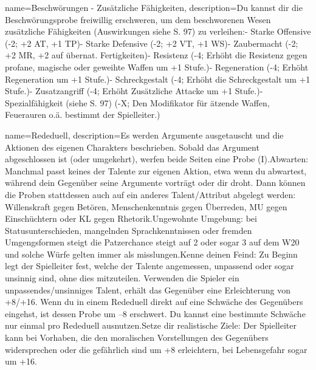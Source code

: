 {
    name={Beschwörungen - Zusätzliche Fähigkeiten},
    description={Du kannst dir die Beschwörungsprobe freiwillig erschweren, um dem beschworenen Wesen zusätzliche Fähigkeiten (Auswirkungen siehe S. 97) zu verleihen:\newline - Starke Offensive (-2; +2 AT, +1 TP)\newline - Starke Defensive (-2; +2 VT, +1 WS)\newline - Zaubermacht (-2; +2 MR, +2 auf übernat. Fertigkeiten)\newline - Resistenz (-4; Erhöht die Resistenz gegen profane, magische oder geweihte Waffen um +1 Stufe.)\newline - Regeneration (-4; Erhöht Regeneration um +1 Stufe.)\newline - Schreckgestalt (-4; Erhöht die Schreckgestalt um +1 Stufe.)\newline - Zusatzangriff (-4; Erhöht Zusätzliche Attacke um +1 Stufe.)\newline - Spezialfähigkeit (siehe S. 97) (-X; Den Modifikator für ätzende Waffen, Feuerauren o.ä. bestimmt der Spielleiter.)}
}


{
    name={Rededuell},
    description={Es werden Argumente ausgetauscht und die Aktionen des eigenen Charakters beschrieben. Sobald das Argument abgeschlossen ist (oder umgekehrt), werfen beide Seiten eine Probe (I).\newline     Abwarten: Manchmal passt keines der Talente zur eigenen Aktion, etwa wenn du abwartest, während dein Gegenüber seine Argumente vorträgt oder dir droht. Dann können die Proben stattdessen auch auf ein anderes Talent/Attribut abgelegt werden: Willenskraft gegen Betören, Menschenkenntnis gegen Überreden, MU gegen Einschüchtern oder KL gegen Rhetorik.\newline     Ungewohnte Umgebung: bei Statusunterschieden, mangelnden Sprachkenntnissen oder fremden Umgengsformen steigt die Patzerchance steigt auf 2 oder sogar 3 auf dem W20 und solche Würfe gelten immer als misslungen.\newline     Kenne deinen Feind: Zu Beginn legt der Spielleiter fest, welche der Talente angemessen, unpassend oder sogar unsinnig sind, ohne dies mitzuteilen. Verwenden die Spieler ein unpassendes/unsinniges Talent, erhält das Gegenüber eine Erleichterung von +8/+16. Wenn du in einem Rededuell direkt auf eine Schwäche des Gegenübers eingehst, ist dessen Probe um –8 erschwert. Du kannst eine bestimmte Schwäche nur einmal pro Rededuell ausnutzen.\newline     Setze dir realistische Ziele: Der Spielleiter kann bei Vorhaben, die den moralischen Vorstellungen des Gegenübers widersprechen oder die gefährlich sind um +8 erleichtern, bei Lebensgefahr sogar um +16.}
}


